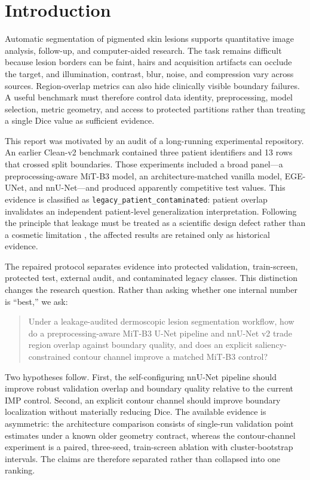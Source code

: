 \section{Introduction}

Automatic segmentation of pigmented skin lesions supports quantitative image analysis, follow-up, and computer-aided research. The task remains difficult because lesion borders can be faint, hairs and acquisition artifacts can occlude the target, and illumination, contrast, blur, noise, and compression vary across sources. Region-overlap metrics can also hide clinically visible boundary failures. A useful benchmark must therefore control data identity, preprocessing, model selection, metric geometry, and access to protected partitions rather than treating a single Dice value as sufficient evidence.

This report was motivated by an audit of a long-running experimental repository. An earlier Clean-v2 benchmark contained three patient identifiers and 13 rows that crossed split boundaries. Those experiments included a broad panel---a preprocessing-aware MiT-B3 model, an architecture-matched vanilla model, EGE-UNet, and nnU-Net---and produced apparently competitive test values. This evidence is classified as \texttt{legacy\_patient\_contaminated}: patient overlap invalidates an independent patient-level generalization interpretation. Following the principle that leakage must be treated as a scientific design defect rather than a cosmetic limitation \citep{kapoor2023leakage}, the affected results are retained only as historical evidence.

The repaired \cleanv{} protocol separates evidence into protected validation, train-screen, protected test, external audit, and contaminated legacy classes. This distinction changes the research question. Rather than asking whether one internal number is ``best,'' we ask:

\begin{quote}\sloppy
Under a leakage-audited dermoscopic lesion segmentation workflow, how do a preprocessing-aware MiT-B3 U-Net pipeline and nnU-Net v2 trade region overlap against boundary quality, and does an explicit saliency-constrained contour channel improve a matched MiT-B3 control?
\end{quote}

Two hypotheses follow. First, the self-configuring nnU-Net pipeline should improve robust validation overlap and boundary quality relative to the current IMP control. Second, an explicit contour channel should improve boundary localization without materially reducing Dice. The available evidence is asymmetric: the architecture comparison consists of single-run validation point estimates under a known older geometry contract, whereas the contour-channel experiment is a paired, three-seed, train-screen ablation with cluster-bootstrap intervals. The claims are therefore separated rather than collapsed into one ranking.

